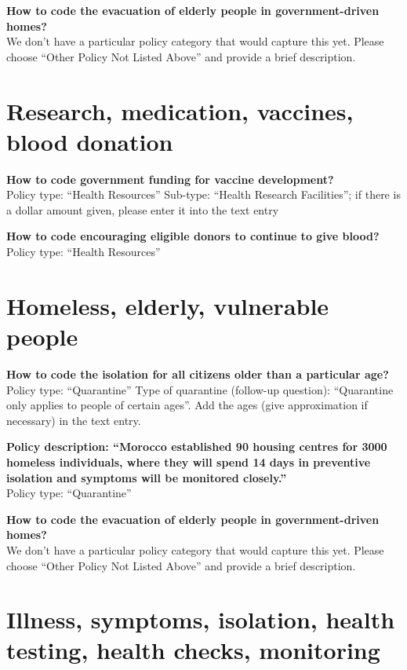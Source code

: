 \documentclass[
]{book}
\begin{document}
\textbf{How to code the evacuation of elderly people in government-driven homes?}\\
We don't have a particular policy category that would capture this yet. Please choose ``Other Policy Not Listed Above'' and provide a brief description.

\hypertarget{research-medication-vaccines-blood-donation}{%
\section{Research, medication, vaccines, blood donation}\label{research-medication-vaccines-blood-donation}}

\textbf{How to code government funding for vaccine development?}\\
Policy type: ``Health Resources''
Sub-type: ``Health Research Facilities''; if there is a dollar amount given, please enter it into the text entry

\textbf{How to code encouraging eligible donors to continue to give blood?}\\
Policy type: ``Health Resources''

\hypertarget{homeless-elderly-vulnerable-people}{%
\section{Homeless, elderly, vulnerable people}\label{homeless-elderly-vulnerable-people}}

\textbf{How to code the isolation for all citizens older than a particular age?}\\
Policy type: ``Quarantine''
Type of quarantine (follow-up question): ``Quarantine only applies to people of certain ages''. Add the ages (give approximation if necessary) in the text entry.

\textbf{Policy description: ``Morocco established 90 housing centres for 3000 homeless individuals, where they will spend 14 days in preventive isolation and symptoms will be monitored closely.''}\\
Policy type: ``Quarantine''

\textbf{How to code the evacuation of elderly people in government-driven homes?}\\
We don't have a particular policy category that would capture this yet. Please choose ``Other Policy Not Listed Above'' and provide a brief description.

\hypertarget{illness-symptoms-isolation-health-testing-health-checks-monitoring}{%
\section{Illness, symptoms, isolation, health testing, health checks, monitoring}\label{illness-symptoms-isolation-health-testing-health-checks-monitoring}}
\end{document}
